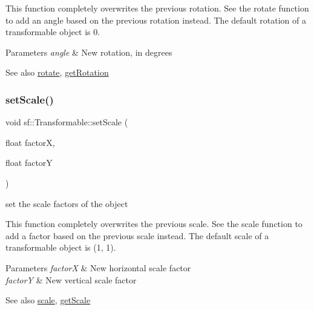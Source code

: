 This function completely overwrites the previous rotation. See the rotate function to add an angle based on the previous rotation instead. The default rotation of a transformable object is 0.


\begin{DoxyParams}{Parameters}
{\em angle} & New rotation, in degrees\\
\hline
\end{DoxyParams}
\begin{DoxySeeAlso}{See also}
\mbox{\hyperlink{classsf_1_1_transformable_af8a5ffddc0d93f238fee3bf8efe1ebda}{rotate}}, \mbox{\hyperlink{classsf_1_1_transformable_aa00b5c5d4a06ac24a94dd72c56931d3a}{get\+Rotation}} \begin{DoxyVerb}\end{DoxyVerb}
 
\end{DoxySeeAlso}
\mbox{\label{classsf_1_1_transformable_aaec50b46b3f41b054763304d1e727471}} 
\subsubsection{\texorpdfstring{setScale()}{setScale()}\hspace{0.1cm}{\footnotesize\ttfamily [1/2]}}
{\footnotesize\ttfamily void sf\+::\+Transformable\+::set\+Scale (\begin{DoxyParamCaption}\item[{float}]{factorX,  }\item[{float}]{factorY }\end{DoxyParamCaption})}



set the scale factors of the object 

This function completely overwrites the previous scale. See the scale function to add a factor based on the previous scale instead. The default scale of a transformable object is (1, 1).


\begin{DoxyParams}{Parameters}
{\em factorX} & New horizontal scale factor \\
\hline
{\em factorY} & New vertical scale factor\\
\hline
\end{DoxyParams}
\begin{DoxySeeAlso}{See also}
\mbox{\hyperlink{classsf_1_1_transformable_a3de0c6d8957f3cf318092f3f60656391}{scale}}, \mbox{\hyperlink{classsf_1_1_transformable_a73819fdea80ca8a06fad8a0067b4588c}{get\+Scale}} \begin{DoxyVerb}\end{DoxyVerb}
 
\end{DoxySeeAlso}
\mbox{\label{classsf_1_1_transformable_a4c48a87f1626047e448f9c1a68ff167e}} 
